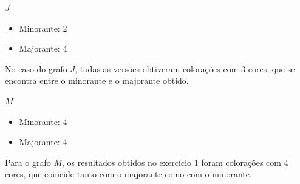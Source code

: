 \documentclass[a4paper,12pt]{report}
\begin{document}
$J$
\begin{itemize}
    \item Minorante: 2
    \item Majorante: 4
\end{itemize}

No caso do grafo $J$, todas as versões obtiveram colorações com 3 cores, que se encontra entre o minorante e o majorante obtido.

$M$
\begin{itemize}
    \item Minorante: 4
    \item Majorante: 4
\end{itemize}

Para o grafo $M$, os resultados obtidos no exercício 1 foram colorações com 4 cores, que coincide tanto com o majorante como com o minorante.


\end{document}
